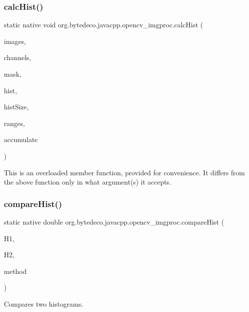 \subsubsection{\texorpdfstring{calc\+Hist()}{calcHist()}\hspace{0.1cm}{\footnotesize\ttfamily [3/3]}}
{\footnotesize\ttfamily static native void org.\+bytedeco.\+javacpp.\+opencv\+\_\+imgproc.\+calc\+Hist (\begin{DoxyParamCaption}\item[{@By\+Val Mat\+Vector}]{images,  }\item[{@Std\+Vector Int\+Pointer}]{channels,  }\item[{@By\+Val Mat}]{mask,  }\item[{@By\+Val Mat}]{hist,  }\item[{@Std\+Vector Int\+Pointer}]{hist\+Size,  }\item[{@Std\+Vector Float\+Pointer}]{ranges,  }\item[{@Cast(\char`\"{}bool\char`\"{}) boolean}]{accumulate }\end{DoxyParamCaption})\hspace{0.3cm}{\ttfamily [static]}}

This is an overloaded member function, provided for convenience. It differs from the above function only in what argument(s) it accepts. \mbox{\label{group__imgproc__hist_ga2c5a33af2393e75272a7346241822627}} 
\subsubsection{\texorpdfstring{compare\+Hist()}{compareHist()}\hspace{0.1cm}{\footnotesize\ttfamily [1/2]}}
{\footnotesize\ttfamily static native double org.\+bytedeco.\+javacpp.\+opencv\+\_\+imgproc.\+compare\+Hist (\begin{DoxyParamCaption}\item[{@By\+Val Mat}]{H1,  }\item[{@By\+Val Mat}]{H2,  }\item[{int}]{method }\end{DoxyParamCaption})\hspace{0.3cm}{\ttfamily [static]}}



Compares two histograms. 

